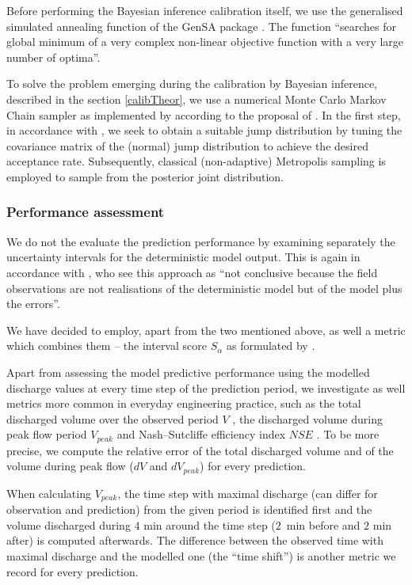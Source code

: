 \documentclass{ctuthesis}\usepackage[]{graphicx}\usepackage[]{color}
\begin{document}
Before performing the  Bayesian inference calibration itself, we use the generalised simulated annealing function of the \textsf{GenSA} package \citep{GenSA}. The function \enquote{searches for global minimum of a very complex non-linear objective function with a very large number of optima}.

To solve the problem emerging during the calibration by Bayesian inference, described in the section \ref{calibTheor}, we use a numerical Monte Carlo Markov Chain sampler as implemented by \cite{adaptmcmc} according to the proposal of \cite{vihola2012robust}. In the first step, in accordance with \cite{giudice2013improving}, we seek to obtain a suitable jump distribution by tuning the covariance matrix of the (normal) jump distribution to achieve the desired acceptance rate. Subsequently, classical (non-adaptive) Metropolis sampling is employed to sample from the posterior joint distribution.


\subsubsection{Performance assessment}

We do not the evaluate the prediction performance  by examining separately the uncertainty intervals for the deterministic model output. This is again in accordance with \cite{giudice2013improving}, who see this approach as \enquote{not conclusive because the field observations are not realisations of the deterministic model but of the model plus the errors}.

We have decided to employ, apart from the two mentioned above,  as well a metric which combines them -- the interval score $S_\alpha$ as formulated by \cite{gneiting2007strictly}.

Apart from assessing the model  predictive performance using the modelled discharge values at every time step of the prediction period, we investigate as well metrics more common in everyday engineering practice, such as the total discharged volume over the observed period $V$ \citep[e.g.][]{fencl2013assessing}, the discharged volume during peak flow period $V_{peak}$  and Nash–Sutcliffe efficiency index $N\!S\!E$ \citep{nash1970river}. To be more precise, we compute the relative error of the total discharged volume and of the volume during peak flow ($dV$ and $dV_{peak}$) for every prediction. 

When calculating $V_{peak}$, the time step with maximal discharge (can differ for observation and prediction) from the given period is identified first and the volume discharged during $4$ min around the time step (\mbox{$2$ min} before and $2$ min after) is computed afterwards. The difference between the observed time with maximal discharge and the modelled one (the \enquote{time shift}) is another metric we record for every prediction.
\end{document}

